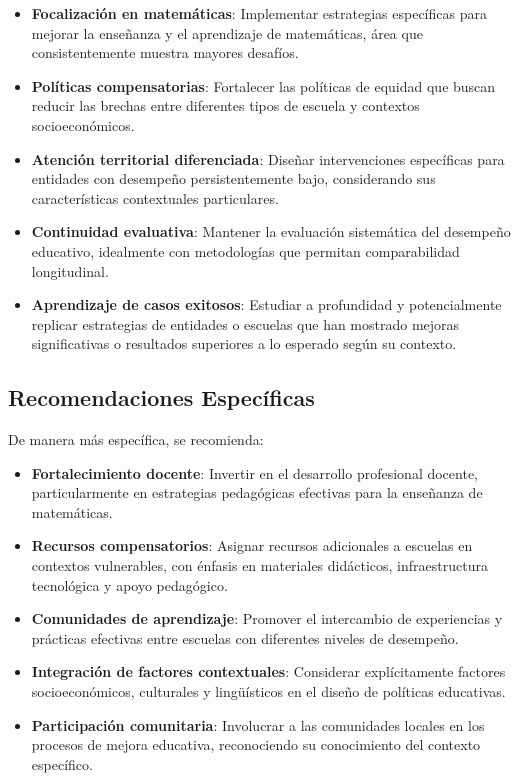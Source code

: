 \begin{itemize}
    \item \textbf{Focalización en matemáticas}: Implementar estrategias específicas para mejorar la enseñanza y el aprendizaje de matemáticas, área que consistentemente muestra mayores desafíos.
    
    \item \textbf{Políticas compensatorias}: Fortalecer las políticas de equidad que buscan reducir las brechas entre diferentes tipos de escuela y contextos socioeconómicos.
    
    \item \textbf{Atención territorial diferenciada}: Diseñar intervenciones específicas para entidades con desempeño persistentemente bajo, considerando sus características contextuales particulares.
    
    \item \textbf{Continuidad evaluativa}: Mantener la evaluación sistemática del desempeño educativo, idealmente con metodologías que permitan comparabilidad longitudinal.
    
    \item \textbf{Aprendizaje de casos exitosos}: Estudiar a profundidad y potencialmente replicar estrategias de entidades o escuelas que han mostrado mejoras significativas o resultados superiores a lo esperado según su contexto.
\end{itemize}

\subsection{Recomendaciones Específicas}
De manera más específica, se recomienda:

\begin{itemize}
    \item \textbf{Fortalecimiento docente}: Invertir en el desarrollo profesional docente, particularmente en estrategias pedagógicas efectivas para la enseñanza de matemáticas.
    
    \item \textbf{Recursos compensatorios}: Asignar recursos adicionales a escuelas en contextos vulnerables, con énfasis en materiales didácticos, infraestructura tecnológica y apoyo pedagógico.
    
    \item \textbf{Comunidades de aprendizaje}: Promover el intercambio de experiencias y prácticas efectivas entre escuelas con diferentes niveles de desempeño.
    
    \item \textbf{Integración de factores contextuales}: Considerar explícitamente factores socioeconómicos, culturales y lingüísticos en el diseño de políticas educativas.
    
    \item \textbf{Participación comunitaria}: Involucrar a las comunidades locales en los procesos de mejora educativa, reconociendo su conocimiento del contexto específico.
\end{itemize}

